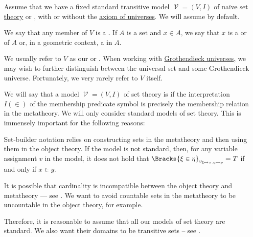 \begin{definition}\label{def:set}
  Assume that we have a fixed \hyperref[rem:standard_model_of_set_theory]{standard} \hyperref[rem:transitive_model_of_set_theory]{transitive} model \( \mscrV = (V, I) \) of \hyperref[def:naive_set_theory]{na\"ive set theory} or \hyperref[def:zfc]{}, with or without the \hyperref[def:axiom_of_universes]{axiom of universes}. We will assume  by default.

  We say that any member of \( V \) is a . If \( A \) is a set and \( x \in A \), we say that \( x \) is a  or  of \( A \) or, in a geometric context, a  in \( A \).

  We usually refer to \( V \) as our  or . When working with \hyperref[def:grothendieck_universe]{Grothendieck universes}, we may wish to further distinguish between the universal set and some Grothendieck universe. Fortunately, we very rarely refer to \( V \) itself.
\end{definition}

\begin{remark}\label{rem:standard_model_of_set_theory}
  We will say that a model \( \mscrV = (V, I) \) of set theory is  if the interpretation \( I(\in) \) of the membership predicate symbol is precisely the membership relation in the metatheory. We will only consider standard models of set theory. This is immensely important for the following reasons:

  \begin{itemize}
     Set-builder notation relies on constructing sets in the metatheory and then using them in the object theory. If the model is not standard, then, for any variable assignment \( v \) in the model, it does not hold that \( \Bracks{\xi \in \eta}_{v_{\xi \mapsto x, \eta \mapsto y}} = T \) if and only if \( x \in y \).

     It is possible that cardinality is incompatible between the object theory and metatheory --- see . We want to avoid countable sets in the metatheory to be uncountable in the object theory, for example.
  \end{itemize}

  Therefore, it is reasonable to assume that all our models of set theory are standard. We also want their domains to be transitive sets -- see .
\end{remark}

